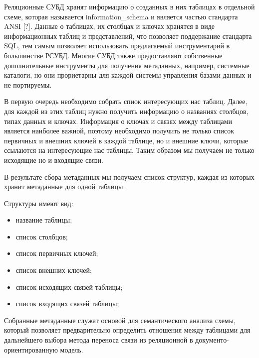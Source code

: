 Реляционные СУБД хранят информацию о созданных в них таблицах в отдельной схеме, 
которая называется information\_schema и является частью стандарта ANSI [?].
Данные о таблицах, их столбцах и ключах хранятся в виде информационных таблиц и представлений, 
что позволяет поддержание стандарта SQL, тем самым позволяет использовать предлагаемый инструментарий в большинстве РСУБД.
Многие СУБД также предоставляют собственные дополнительные инструменты для получения метаданных, например, системные каталоги,
но они прориетарны для каждой системы управления базами данных и не портируемы.

В первую очередь необходимо собрать спиок интересующих нас таблиц.
Далее, для каждой из этих таблиц нужно получить информацию о названиях столбцов, типах данных и ключах.
Информация о ключах и связях между таблицами является наиболее важной, 
поэтому необходимо получить не только список первичных и внешних ключей в каждой таблице, но и внешние ключи, 
которые ссылаются на интересующие нас таблицы.
Таким образом мы получаем не только исходящие но и входящие связи.

В результате сбора метаданных мы получаем список структур, каждая из которых хранит метаданные для одной таблицы.

\noindent Структуры имеют вид:
\begin{itemize}[label=---]
    \item название таблицы;
    \item список столбцов; 

    \item список первичных ключей;
    \item список внешних ключей;
    \item список исходящих связей таблицы;
    \item список входящих связей таблицы;
\end{itemize}

Собранные метаданные служат основой для семантического анализа схемы, 
который позволяет предварительно определить отношения между таблицами для 
дальнейшего выбора метода переноса связи из реляционной в документо-ориентированную модель.

